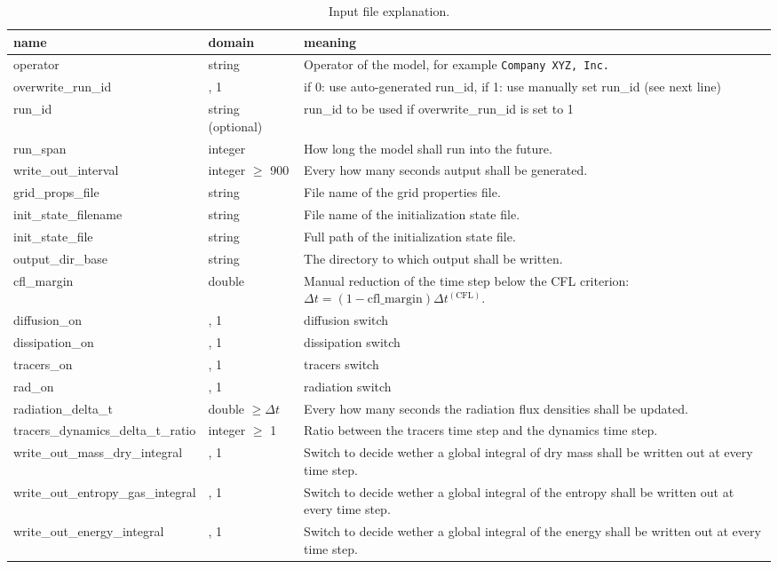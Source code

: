 \documentclass{article}
\begin{document}
\renewcommand{\arraystretch}{1.2}
\begin{table}
\centering
\begin{tabular}{|>{\centering}p{4.0 cm}|>{\centering}p{3 cm}|>{\centering}p{7 cm}|}
\hline \textbf{name} & \textbf{domain} & \textbf{meaning} \tabularnewline
\hline\hline operator & string & Operator of the model, for example \texttt{Company XYZ, Inc.} \tabularnewline
\hline overwrite\_run\_id & 0, 1 & if 0: use auto-generated run\_id, if 1: use manually set run\_id (see next line) \tabularnewline
\hline run\_id & string (optional) & run\_id to be used if overwrite\_run\_id is set to 1 \tabularnewline
\hline run\_span & integer & How long the model shall run into the future. \tabularnewline
\hline write\_out\_interval & integer $\geq$ 900 & Every how many seconds autput shall be generated. \tabularnewline
\hline grid\_props\_file & string & File name of the grid properties file. \tabularnewline
\hline init\_state\_filename & string & File name of the initialization state file. \tabularnewline
\hline init\_state\_file & string & Full path of the initialization state file. \tabularnewline
\hline output\_dir\_base & string & The directory to which output shall be written. \tabularnewline
\hline cfl\_margin & double & Manual reduction of the time step below the CFL criterion: $\Delta t = \left(1 - \text{cfl\_margin}\right)\Delta t^{(\text{CFL})}$. \tabularnewline
\hline diffusion\_on & 0, 1 & diffusion switch \tabularnewline
\hline dissipation\_on & 10, 1 & dissipation switch \tabularnewline
\hline tracers\_on & 0, 1 & tracers switch \tabularnewline
\hline rad\_on & 0, 1 & radiation switch \tabularnewline
\hline radiation\_delta\_t & double $\geq \Delta t$ & Every how many seconds the radiation flux densities shall be updated.  \tabularnewline
\hline tracers\_dynamics\_delta\_t\_ratio & integer $\geq$ 1 & Ratio between the tracers time step and the dynamics time step. \tabularnewline
\hline write\_out\_mass\_dry\_integral & 0, 1 & Switch to decide wether a global integral of dry mass shall be written out at every time step. \tabularnewline
\hline write\_out\_entropy\_gas\_integral & 0, 1 & Switch to decide wether a global integral of the entropy shall be written out at every time step. \tabularnewline
\hline write\_out\_energy\_integral & 0, 1 & Switch to decide wether a global integral of the energy shall be written out at every time step. \tabularnewline
\hline 
\end{tabular}
\caption{Input file explanation.}
\label{tab:input_file_explanation}
\end{table}
\renewcommand{\arraystretch}{1}
\end{document}
